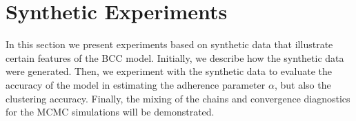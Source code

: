 \section{Synthetic Experiments} \label{integr-synth-exper-sect}
In this section we present experiments based on synthetic data that illustrate certain features of the BCC model. Initially, we describe how the synthetic data were generated. Then, we experiment with the synthetic data to evaluate the accuracy of the model in estimating the adherence parameter $\alpha$, but also the clustering accuracy. Finally, the mixing of the chains and convergence diagnostics for the MCMC simulations will be demonstrated.





